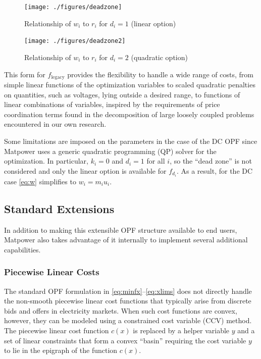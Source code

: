 \documentclass[12pt]{article}
\newcommand{\matpower}[0]{{\sc Matpower}}
\numberwithin{equation}{section}
\numberwithin{table}{section}
\numberwithin{figure}{section}
\begin{document}
\begin{itemize}
\begin{figure}[hbtp]
  \centering
  \texttt{[image: ./figures/deadzone]}
  \caption{Relationship of $w_i$ to $r_i$ for $d_i = 1$ (linear option)}
  \label{fig:deadzone}
\end{figure}

\begin{figure}[hbtp]
  \centering
  \texttt{[image: ./figures/deadzone2]}
  \caption{Relationship of $w_i$ to $r_i$ for $d_i = 2$ (quadratic option)}
  \label{fig:deadzone2}
\end{figure}

This form for $f_\mathrm{legacy}$ provides the flexibility to handle a wide range of costs, from simple linear functions of the optimization variables to scaled quadratic penalties on quantities, such as voltages, lying outside a desired range, to functions of linear combinations of variables, inspired by the requirements of price coordination terms found in the decomposition of large loosely coupled problems encountered in our own research.

Some limitations are imposed on the parameters in the case of the DC OPF since \matpower{} uses a generic quadratic programming (QP) solver for the optimization. In particular, $k_i = 0$ and $d_i = 1$ for all $i$, so the ``dead zone'' is not considered and only the linear option is available for $f_{d_i}$. As a result, for the DC case \eqref{eq:w} simplifies to $w_i = m_i u_i$.
\end{itemize}


\subsection{Standard Extensions}
\label{sec:standard_extensions}

In addition to making this extensible OPF structure available to end users, \matpower{} also takes advantage of it internally to implement several additional capabilities.

\subsubsection{Piecewise Linear Costs}

The standard OPF formulation in \eqref{eq:minfx}--\eqref{eq:xlims} does not directly handle the non-smooth piecewise linear cost functions that typically arise from discrete bids and offers in electricity markets. When such cost functions are convex, however, they can be modeled using a constrained cost variable (CCV) method. The piecewise linear cost function $c(x)$ is replaced by a helper variable $y$ and a set of linear constraints that form a convex ``basin'' requiring the cost variable $y$ to lie in the epigraph of the function $c(x)$.
\end{document}

